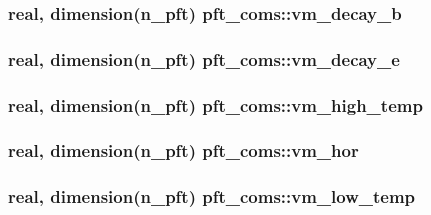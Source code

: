 \subsubsection[{vm\+\_\+decay\+\_\+b}]{\setlength{\rightskip}{0pt plus 5cm}real, dimension(n\+\_\+pft) pft\+\_\+coms\+::vm\+\_\+decay\+\_\+b}\label{namespacepft__coms_a21f9c00aea9610811aae2469b5070c1b}
\hypertarget{namespacepft__coms_a05c121e99b033c3fa874fc7ffd66fad3}{}
\subsubsection[{vm\+\_\+decay\+\_\+e}]{\setlength{\rightskip}{0pt plus 5cm}real, dimension(n\+\_\+pft) pft\+\_\+coms\+::vm\+\_\+decay\+\_\+e}\label{namespacepft__coms_a05c121e99b033c3fa874fc7ffd66fad3}
\hypertarget{namespacepft__coms_a847c455daab9b125944dd2057d418b6c}{}
\subsubsection[{vm\+\_\+high\+\_\+temp}]{\setlength{\rightskip}{0pt plus 5cm}real, dimension(n\+\_\+pft) pft\+\_\+coms\+::vm\+\_\+high\+\_\+temp}\label{namespacepft__coms_a847c455daab9b125944dd2057d418b6c}
\hypertarget{namespacepft__coms_a1424943ac59ffe1e85af3d7eeca315bb}{}
\subsubsection[{vm\+\_\+hor}]{\setlength{\rightskip}{0pt plus 5cm}real, dimension(n\+\_\+pft) pft\+\_\+coms\+::vm\+\_\+hor}\label{namespacepft__coms_a1424943ac59ffe1e85af3d7eeca315bb}
\hypertarget{namespacepft__coms_abc805ab81f6ae61cf4ccfb36fd352fdc}{}
\subsubsection[{vm\+\_\+low\+\_\+temp}]{\setlength{\rightskip}{0pt plus 5cm}real, dimension(n\+\_\+pft) pft\+\_\+coms\+::vm\+\_\+low\+\_\+temp}\label{namespacepft__coms_abc805ab81f6ae61cf4ccfb36fd352fdc}
\hypertarget{namespacepft__coms_a47018d91ecb1fe0c547ec131348e5fdd}{}
